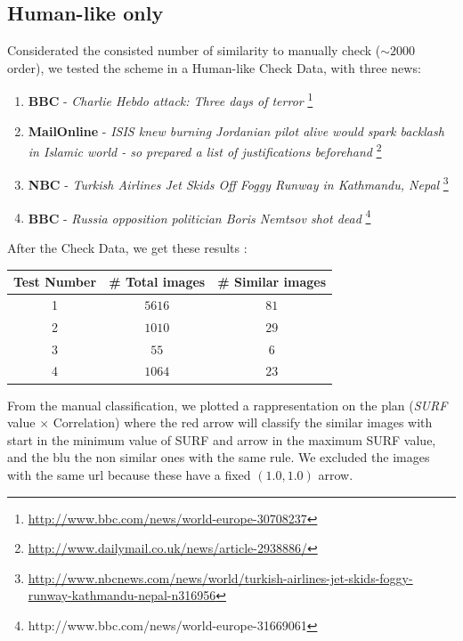 \documentclass[10pt, journal,twocolumn]{IEEEtran}
\begin{document}
\subsection{Human-like only}

Considerated the consisted number of similarity to manually check ($\sim 2000$ order), we tested the scheme in a Human-like Check Data, with three news:

\begin{enumerate}
  \item \textbf{BBC} - \emph{Charlie Hebdo attack: Three days of terror} \footnote{\url{http://www.bbc.com/news/world-europe-30708237}}
  \item \textbf{MailOnline} - \emph{ISIS knew burning Jordanian pilot alive would spark backlash in Islamic world - so prepared a list of justifications beforehand} \footnote{\url{http://www.dailymail.co.uk/news/article-2938886/}}
  \item \textbf{NBC} - \emph{Turkish Airlines Jet Skids Off Foggy Runway in Kathmandu, Nepal} \footnote{\url{http://www.nbcnews.com/news/world/turkish-airlines-jet-skids-foggy-runway-kathmandu-nepal-n316956}}
  \item \textbf{BBC} - \emph{Russia opposition politician Boris Nemtsov shot dead} \footnote{http://www.bbc.com/news/world-europe-31669061}
\end{enumerate}

After the Check Data, we get these results :

\begin{center}
\begin{tabular}{|c|c|c|}
\hline
Test Number & \# Total images & \# Similar images \\
\hline\hline
1 & $5616$ & $81$ \\    \hline
2 & $1010$ & $29$ \\    \hline
3 & $55$ & $6$    \\ \hline
4 & $1064$ & $23$ \\ \hline
\end{tabular}
\end{center}

From the manual classification, we plotted a rappresentation on the plan (\emph{SURF} value $\times$ Correlation) where the red arrow will classify the similar images with start in the minimum value of SURF and arrow in the maximum SURF value, and the blu the non similar ones with the same rule. We excluded the images with the same url because these have a fixed $(1.0 , 1.0)$ arrow.\\
\end{document}
